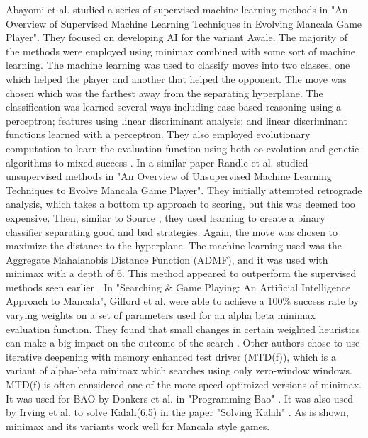 \documentclass[]{article}
\begin{document}
Abayomi et al. studied a series of supervised machine learning methods in "An Overview of Supervised Machine Learning Techniques in Evolving Mancala Game Player". They focused on developing AI for the variant Awale. The majority of the methods were employed using minimax combined with some sort of machine learning. The machine learning was used to classify moves into two classes, one which helped the player and another that helped the opponent. The move was chosen which was the farthest away from the separating hyperplane. The classification was learned several ways including case-based reasoning using a perceptron; features using linear discriminant analysis; and linear discriminant functions learned with a perceptron. They also employed evolutionary computation to learn the evaluation function using both co-evolution and genetic algorithms to mixed success \cite{abayomi2013overview}. In a similar paper Randle et al. studied unsupervised methods in "An Overview of Unsupervised Machine Learning Techniques to Evolve Mancala Game Player". They initially attempted retrograde analysis, which takes a bottom up approach to scoring, but this was deemed too expensive. Then, similar to Source \cite{abayomi2013overview}, they used learning to create a binary classifier separating good and bad strategies. Again, the move was chosen to maximize the distance to the hyperplane. The machine learning used was the Aggregate Mahalanobis Distance Function (ADMF), and it was used with minimax with a depth of 6. This method appeared to outperform the supervised methods seen earlier \cite{randle2013overview}. In "Searching \& Game Playing: An Artificial Intelligence Approach to Mancala", Gifford et al. were able to achieve a 100\% success rate by varying weights on a set of parameters used for an alpha beta minimax evaluation function. They found that small changes in certain weighted heuristics can make a big impact on the outcome of the search \cite{gifford2008searching}. Other authors chose to use iterative deepening with memory enhanced test driver (MTD(f)), which is a variant of alpha-beta minimax which searches using only zero-window windows. MTD(f) is often considered one of the more speed optimized versions of minimax. It was used for BAO by Donkers et al. in "Programming Bao" \cite{donkers2002programming}. It was also used by Irving et al. to solve Kalah(6,5) in the paper "Solving Kalah" \cite{irving2000solving}. As is shown, minimax and its variants work well for Mancala style games. 
\end{document}

